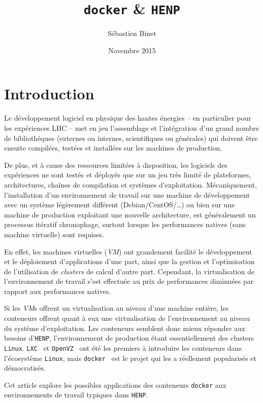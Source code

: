 \documentclass[a4paper]{article}
\title{\texttt{docker} \& \texttt{HENP}}
\author{S\'ebastien Binet}
\date{Novembre 2015}
\affil{CNRS/IN2P3/LPC}
\begin{document}
\maketitle

\section*{Introduction}
Le d\'eveloppement logiciel en physique des hautes \'energies -- en particulier
pour les exp\'eriences LHC -- met en jeu l'assemblage et l'int\'egration d'un
grand nombre de biblioth\`eques (externes ou internes, scientifiques ou
g\'en\'erales) qui doivent \^etre ensuite compil\'ees, test\'ees et install\'ees
sur les machines de production.

De plus, et \`a cause des ressources limit\'ees \`a disposition, les logiciels
des exp\'eriences ne sont test\'es et d\'eploy\'es que sur un jeu tr\`es
limit\'e de plateformes, architectures, cha\^ines de compilation et syst\`emes
d'exploitation.
M\'ecaniquement, l'installation d'un environnement de travail sur une machine de
d\'eveloppement avec un syst\`eme l\'eg\`erement diff\'erent
(Debian/CentOS/\ldots) ou bien sur une
machine de production exploitant une nouvelle architecture, est g\'en\'eralement
un processus it\'eratif chronophage, surtout lorsque les performances natives
(sans machine virtuelle) sont requises.

En effet, les machines virtuelles (\emph{VM}) ont grandement facilit\'e le
d\'evelop\-pement et le d\'eploiement d'applications d'une part, ainsi que la
gestion et l'optimisation de l'utilisation de \emph{clusters} de calcul d'autre
part.
Cependant, la virtualisation de l'environnement de travail s'est effectu\'ee au
prix de performances diminu\'ees par rapport aux performances natives.

Si les \emph{VM}s offrent un virtualisation au niveau d'une machine enti\`ere,
les conteneurs offrent quant \`a eux une virtualisation de l'environnement au
niveau du syst\`eme d'exploitation.
Les conteneurs semblent donc mieux r\'epondre aux besoins d'\texttt{HENP},
l'environnement de production \'etant essentiellement des clusters
\texttt{Linux}.
\texttt{LXC}~\cite{ref-lxc} et \texttt{OpenVZ}~\cite{ref-openvz} ont \'et\'e les
premiers \`a introduire les conteneurs dans l'\'ecosyst\`eme \texttt{Linux}, mais
\texttt{docker}~\cite{ref-docker} est le projet qui les a r\'eellement
popularis\'es et d\'emocratis\'es.

Cet article explore les possibles applications des conteneurs \texttt{docker}
aux environnements de travail typiques dans \texttt{HENP}.
\end{document}
